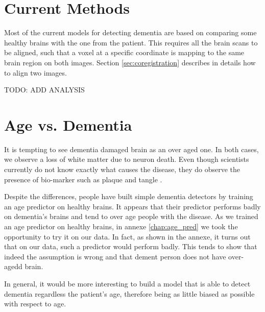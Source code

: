 \section{Current Methods}
Most of the current models for detecting dementia are based on comparing some healthy brains with the one from the patient. This requires all the brain scans to be aligned, such that a voxel at a specific coordinate is mapping to the same brain region on both images. Section \ref{sec:coregistration} describes in details how to align two images.

TODO: ADD ANALYSIS


\section{Age vs. Dementia}

It is tempting to see dementia damaged brain as an over aged one. In both cases, we observe a loss of white matter due to neuron death. Even though scientists currently do not know exactly what causes the disease, they do observe the presence of bio-marker such as plaque and tangle \cite{alzheimer_past_present_future}.

Despite the differences, people have built simple dementia detectors by training an age predictor on healthy brains. It appears that their predictor performs badly on dementia's brains and tend to over age people with the disease. As we trained an age predictor on healthy brains, in annexe \ref{chap:age_pred} we took the opportunity to try it on our data. In fact, as shown in the annexe, it turns out that on our data, such a predictor would perform badly. This tends to show that indeed the assumption is wrong and that dement person does not have over-agedd brain.

In general, it would be more interesting to build a model that is able to detect dementia regardless the patient's age, therefore being as little biased as possible with respect to age.